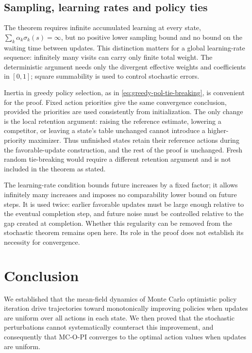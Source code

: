 \subsection{Sampling, learning rates and policy ties}
\label{sec: relaxing conditions}
The theorem requires infinite accumulated learning at every state, $\sum_k\alpha_k\sigma_k(s)=\infty$, but no positive lower sampling bound and no bound on the waiting time between updates. This distinction matters for a global learning-rate sequence: infinitely many visits can carry only finite total weight. The deterministic argument needs only the divergent effective weights and coefficients in $[0,1]$; square summability is used to control stochastic errors.

Inertia in greedy policy selection, as in \eqref{eq:greedy-pol-tie-breaking}, is convenient for the proof. Fixed action priorities give the same convergence conclusion, provided the priorities are used consistently from initialization. The only change is the local retention argument: raising the reference estimate, lowering a competitor, or leaving a state's table unchanged cannot introduce a higher-priority maximizer. Thus unfinished states retain their reference actions during the favorable-update construction, and the rest of the proof is unchanged. Fresh random tie-breaking would require a different retention argument and is not included in the theorem as stated.

The learning-rate condition bounds future increases by a fixed factor; it allows infinitely many increases and imposes no comparability lower bound on future steps. It is used twice: earlier favorable updates must be large enough relative to the eventual completion step, and future noise must be controlled relative to the gap created at completion. Whether this regularity can be removed from the stochastic theorem remains open here. Its role in the proof does not establish its necessity for convergence.

\section{Conclusion}






We established that the mean-field dynamics of Monte Carlo optimistic policy iteration drive trajectories toward monotonically improving policies when updates are uniform over all actions in each state. 
We then proved that the stochastic perturbations cannot systematically counteract this improvement,
and consequently that MC-O-PI converges to the optimal action values when updates are uniform.



